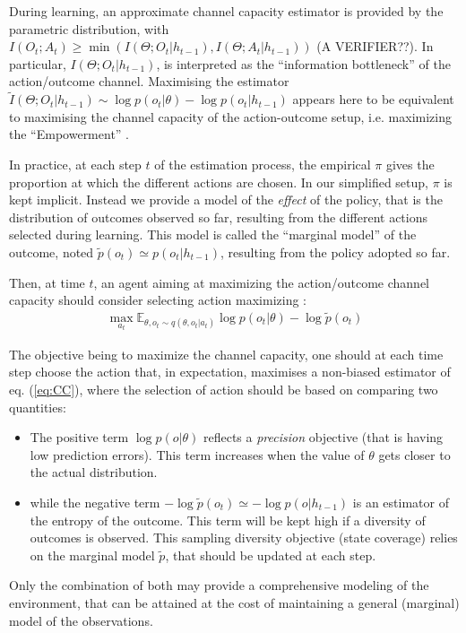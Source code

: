 \documentclass[10pt,letterpaper]{article}
\begin{document}

During learning, an approximate channel capacity estimator is provided by the parametric distribution, with {\color{magenta} $I(O_t;A_t)\geq \min(I(\Theta;O_t|h_{t-1}), I(\Theta;A_t|h_{t-1}))$ (A VERIFIER??)}. In particular, $I(\Theta;O_t|h_{t-1})$, is interpreted as the ``information bottleneck'' of the action/outcome channel. Maximising the estimator $\tilde{I}(\Theta;O_t|h_{t-1}) \sim  \log p(o_t|\theta) - \log p(o_t|h_{t-1})$  appears here to be equivalent to maximising the channel capacity of the action-outcome setup, i.e. maximizing the ``Empowerment'' \cite{Klyubin2005EmpowermentAU}.

In practice, at each step $t$ of the estimation process, the empirical $\pi$ gives the proportion at which the different actions are chosen. %
In our simplified setup, $\pi$ is kept implicit. %
Instead we provide a model of the \emph{effect} of the policy, that is the distribution of outcomes observed so far, resulting from the different actions selected during learning.
This model is called the ``marginal model'' of the outcome, noted $\tilde{p}(o_t) \simeq p(o_t|h_{t-1})$, resulting from the policy adopted so far.

Then, at time $t$, an agent aiming at maximizing the action/outcome channel capacity should consider selecting action maximizing :
\begin{align}
    \max_{a_t} \mathbb{E}_{\theta,o_t\sim q(\theta,o_t|a_t)} \log p(o_t|\theta) - \log \tilde{p}(o_t)
    \label{eq:CC}
\end{align}

The objective being to maximize the channel capacity, one should at each time step choose the action that, in expectation, maximises a non-biased estimator of eq. (\ref{eq:CC}),
where the selection of action should be based on comparing two quantities:
\begin{itemize}
\item The positive term  $\log p(o|\theta)$ reflects a \emph{precision} objective (that is having low prediction errors). This term increases when the value of $\theta$ gets closer to the actual distribution.  
\item while the negative term $ -\log \tilde{p}(o_t) \simeq - \log p(o|h_{t-1}) $ is an estimator of the entropy of the outcome. This term will be kept high if a diversity of outcomes is observed. This sampling diversity objective (state coverage) relies on the marginal model $\tilde{p}$, that should be updated at each step. 
\end{itemize}
Only the combination of both may provide a comprehensive modeling of the environment, that can be attained at the cost of maintaining a general (marginal) model of the observations.   
\end{document}
